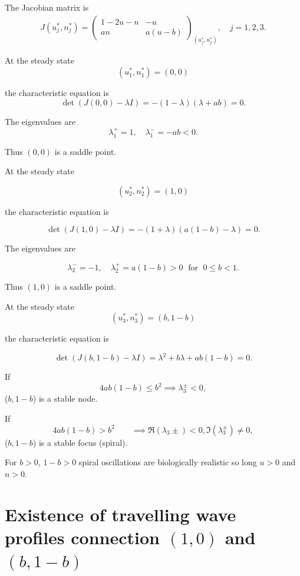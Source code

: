 \documentclass[
  letterpaper,
  DIV=11,
  numbers=noendperiod]{scrreprt}
\theoremstyle{plain}
\theoremstyle{definition}
\theoremstyle{plain}
\theoremstyle{remark}
\begin{document}
The Jacobian matrix is \[
\begin{aligned}
J(u_j^\ast, n^\ast_j) = 
\begin{pmatrix}
1-2u -n & -u \\
an &a(u-b)
\end{pmatrix}_{(u^\ast_j, n^\ast_j)}, \quad j = 1,2,3.
\end{aligned}
\]

At the steady state \[
(u_1^\ast, n_1^\ast)= (0,0)
\]

the characteristic equation is \[
\det(J (0,0) - \lambda I) = - (1- \lambda)(\lambda+ ab) = 0.
\]

The eigenvalues are \[
\lambda_1^+ = 1, \quad \lambda_1^- = - ab <0.
\]

Thus \((0,0)\) is a saddle point.

At the steady state

\[
(u_2^\ast, n_2^\ast)= (1,0)
\]

the characteristic equation is

\[
\det(J (1,0) - \lambda I) = - (1+ \lambda)(a(1-b)- \lambda) = 0.
\]

The eigenvalues are

\[
\lambda_2^- =- 1, \quad \lambda_2^+ = a(1-b) >0 \; \text{ for } \; 0 \leq b <1.
\]

Thus \((1,0)\) is a saddle point.

At the steady state \[
(u_3^\ast, n_3^\ast)= (b,1-b)
\]

the characteristic equation is

\[
\det(J (b,1-b) - \lambda I) =\lambda^2 + b \lambda + ab(1-b) = 0.
\]

If \[
4 ab (1-b) \leq b^2  \implies \lambda_3^{\pm} < 0,
\] (\(b,1-b\)) is a stable node.

If\\
\[
4 ab (1-b) > b^2 \qquad \implies  \Re(\lambda_3{\pm}) < 0,  \Im(\lambda_3^{\pm}) \neq 0,
\] (\(b,1-b\)) is a stable focus (spiral).

For \(b>0\), \(1-b>0\) spiral oscillations are biologically realistic so
long \(u>0\) and \(n>0\).

\hypertarget{existence-of-travelling-wave-profiles-connection-10-and-b1-b}{%
\section{\texorpdfstring{Existence of travelling wave profiles
connection \((1,0)\) and
\((b,1-b)\)}{Existence of travelling wave profiles connection (1,0) and (b,1-b)}}\label{existence-of-travelling-wave-profiles-connection-10-and-b1-b}}
\end{document}
